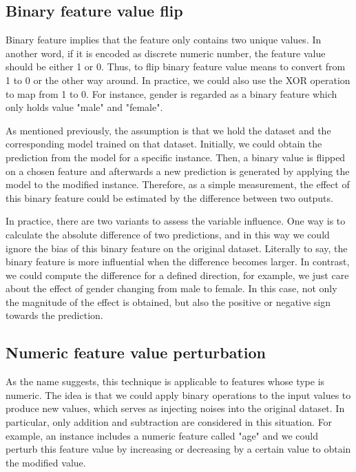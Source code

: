 \subsection{Binary feature value flip}

Binary feature implies that the feature only contains two unique values. In another word, if it is encoded as discrete numeric number, the feature value should be either 1 or 0. Thus, to flip binary feature value means to convert from 1 to 0 or the other way around. In practice, we could also use the XOR operation to map from 1 to 0. For instance, gender is regarded as a binary feature which only holds value "male" and "female". 

As mentioned previously, the assumption is that we hold the dataset and the corresponding model trained on that dataset. Initially, we could obtain the prediction from the model for a specific instance. Then, a binary value is flipped on a chosen feature and afterwards a new prediction is generated by applying the model to the modified instance. Therefore, as a simple measurement, the effect of this binary feature could be estimated by the difference between two outputs. 

In practice, there are two variants to assess the variable influence. One way is to calculate the absolute difference of two predictions, and in this way we could ignore the bias of this binary feature on the original dataset. Literally to say, the binary feature is more influential when the difference becomes larger. In contrast, we could compute the difference for a defined direction, for example, we just care about the effect of gender changing from male to female. In this case, not only the magnitude of the effect is obtained, but also the positive or negative sign towards the prediction.  

\subsection{Numeric feature value perturbation}

As the name suggests, this technique is applicable to features whose type is numeric. The idea is that we could apply binary operations to the input values to produce new values, which serves as injecting noises into the original dataset. In particular, only addition and subtraction are considered in this situation. For example, an instance includes a numeric feature called "age" and we could perturb this feature value by increasing or decreasing by a certain value to obtain the modified value. 

